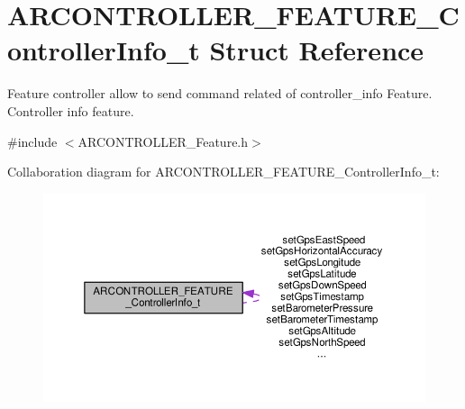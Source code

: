 \hypertarget{struct_a_r_c_o_n_t_r_o_l_l_e_r___f_e_a_t_u_r_e___controller_info__t}{}\section{A\+R\+C\+O\+N\+T\+R\+O\+L\+L\+E\+R\+\_\+\+F\+E\+A\+T\+U\+R\+E\+\_\+\+Controller\+Info\+\_\+t Struct Reference}
\label{struct_a_r_c_o_n_t_r_o_l_l_e_r___f_e_a_t_u_r_e___controller_info__t}


Feature controller allow to send command related of controller\+\_\+info Feature. Controller info feature.  




{\ttfamily \#include $<$A\+R\+C\+O\+N\+T\+R\+O\+L\+L\+E\+R\+\_\+\+Feature.\+h$>$}



Collaboration diagram for A\+R\+C\+O\+N\+T\+R\+O\+L\+L\+E\+R\+\_\+\+F\+E\+A\+T\+U\+R\+E\+\_\+\+Controller\+Info\+\_\+t\+:
\nopagebreak
\begin{figure}[H]
\begin{center}
\leavevmode
\includegraphics[width=350pt]{struct_a_r_c_o_n_t_r_o_l_l_e_r___f_e_a_t_u_r_e___controller_info__t__coll__graph}
\end{center}
\end{figure}

